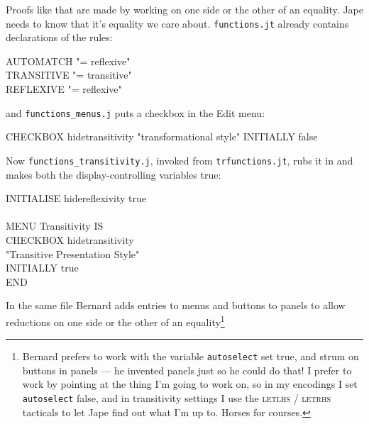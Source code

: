Proofs like that are made by working on one side or the other of an equality. Jape needs to know that it's equality we care about. \texttt{functions.jt} already contains declarations of the rules:
\begin{japeish}
AUTOMATCH "= reflexive" \\
TRANSITIVE  "= transitive" \\
REFLEXIVE "= reflexive" \\
\end{japeish}
and \texttt{functions\_menus.j} puts a checkbox in the Edit menu:
\begin{japeish}
CHECKBOX hidetransitivity "transformational style" INITIALLY false
\end{japeish}
Now \texttt{functions\_transitivity.j}, invoked from \texttt{trfunctions.jt}, rubs it in and makes both the display-controlling variables true:
\begin{japeish}
INITIALISE hidereflexivity true \\
\\
MENU Transitivity IS \\
\tab CHECKBOX  hidetransitivity \\
\tab\tab "Transitive Presentation Style" \\ 
    INITIALLY true \\
END \\
\end{japeish}
In the same file Bernard adds entries to menus and buttons to panels to allow reductions on one side or the other of an equality\footnote{Bernard prefers to work with the variable \texttt{autoselect} set true, and strum on buttons in panels --- he invented panels just so he could do that! I prefer to work by pointing at the thing I'm going to work on, so in my encodings I set \texttt{autoselect} false, and in transitivity settings I use the \textsc{letlhs} / \textsc{letrhs} tacticals to let Jape find out what I'm up to. Horses for courses.}
